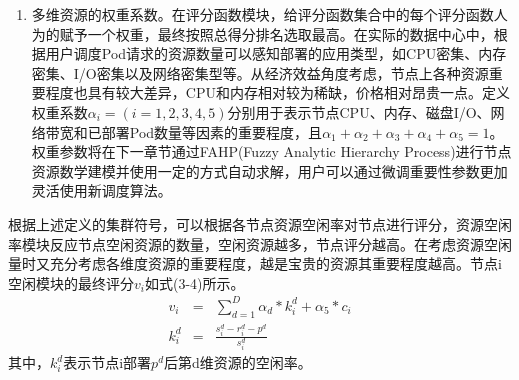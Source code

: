 \begin{enumerate}[(1)]
	\item 多维资源的权重系数。在评分函数模块，给评分函数集合中的每个评分函数人为的赋予一个权重，最终按照总得分排名选取最高。在实际的数据中心中，根据用户调度Pod请求的资源数量可以感知部署的应用类型，如CPU密集、内存密集、I/O密集以及网络密集型等。从经济效益角度考虑，节点上各种资源重要程度也具有较大差异，CPU和内存相对较为稀缺，价格相对昂贵一点。定义权重系数\begin{math}\alpha_{i}=(i=1, 2, 3, 4, 5)\end{math}分别用于表示节点CPU、内存、磁盘I/O、网络带宽和已部署Pod数量等因素的重要程度，且\begin{math}\alpha_{1}+\alpha_{2}+\alpha_{3}+\alpha_{4}+\alpha_{5}=1\end{math}。权重参数将在下一章节通过FAHP(Fuzzy Analytic Hierarchy Process)进行节点资源数学建模并使用一定的方式自动求解，用户可以通过微调重要性参数更加灵活使用新调度算法。
\end{enumerate}

根据上述定义的集群符号，可以根据各节点资源空闲率对节点进行评分，资源空闲率模块反应节点空闲资源的数量，空闲资源越多，节点评分越高。在考虑资源空闲量时又充分考虑各维度资源的重要程度，越是宝贵的资源其重要程度越高。节点i空闲模块的最终评分\begin{math}v_{i}\end{math}如式(3-4)所示。
\begin{eqnarray}
v_{i} & = & \sum_{d=1}^{D}\alpha_{d}*k_{i}^{d}+\alpha_{5}*c_{i} \\
k_{i}^{d} & = & \frac{s_{i}^{d}-r_{i}^{d}-p^{d}}{s_{i}^{d}}
\end{eqnarray}
其中，\begin{math}k_{i}^{d}\end{math}表示节点i部署\begin{math}p^{d}\end{math}后第d维资源的空闲率。


